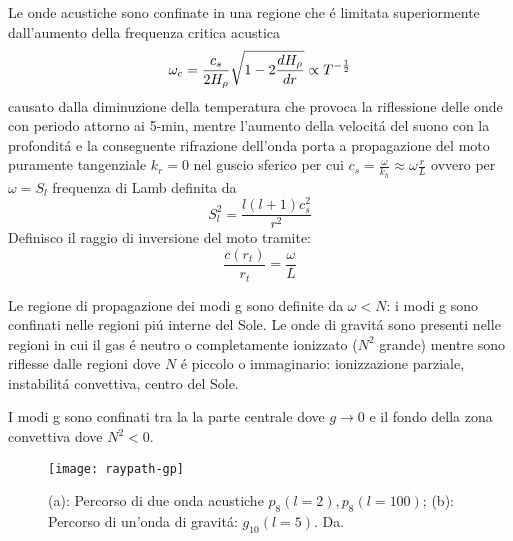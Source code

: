 \documentclass[../main.tex]{subfiles}
\begin{document}
Le onde acustiche sono confinate in una regione che \'e limitata superiormente dall'aumento della frequenza critica acustica
\begin{equation}
\omega_c=\frac{c_s}{2H_{\rho}{}}\sqrt{1-2\frac{d H_{\rho}{}}{d r}}\propto T^{-\frac{1}{2}}\label{eq:acusticcutoff}
\end{equation}
 causato dalla diminuzione della temperatura che provoca la riflessione delle onde con periodo attorno ai 5-min, mentre l'aumento della velocit\'a del suono con la profondit\'a e la conseguente rifrazione dell'onda porta a propagazione del moto puramente tangenziale $k_r=0$ nel guscio sferico per cui $c_s=\frac{\omega}{k_h}\approx\omega \frac{r}{L}$ ovvero per $\omega=S_l$ frequenza di Lamb definita da
\begin{equation}
S_l^2=\frac{l(l+1)c_s^2}{r^2}\label{eq:Lambf}
\end{equation}
Definisco il raggio di inversione del moto tramite:
\begin{equation}
\frac{c(r_t)}{r_t}=\frac{\omega}{L}
\end{equation}

Le regione di propagazione dei modi g sono definite da $\omega<N$: i modi g sono confinati nelle regioni pi\'u interne del Sole.
Le onde di gravit\'a sono presenti nelle regioni in cui il gas \'e neutro o completamente ionizzato ($N^2$ grande) mentre sono riflesse dalle regioni dove $N$ \'e piccolo o immaginario: ionizzazione parziale, instabilit\'a convettiva, centro del Sole.

I modi g sono confinati tra la la parte centrale dove $g\to0$ e il fondo della zona convettiva dove $N^2<0$.

\begin{figure}[!ht]
\texttt{[image: raypath-gp]}
\caption{(a): Percorso di due onda acustiche $p_8(l=2), p_8(l=100)$; (b): Percorso di un'onda di gravit\'a: $g_{10}(l=5)$. Da\cite{gou91seismic}.}
\end{figure}
\end{document}
